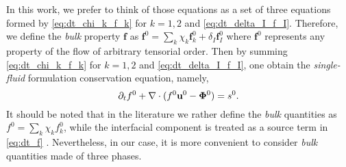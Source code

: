 In this work, we prefer to think of those equations as a set of three equations formed by \ref{eq:dt_chi_k_f_k} for $k=1,2$ and \ref{eq:dt_delta_I_f_I}. 
Therefore, we define the \textit{bulk} property $\textbf{f}$ as $\textbf{f}^0 = \sum_k \chi_k \textbf{f}_k^0 + \delta_I \textbf{f}_I^0$ where $\textbf{f}^0$ represents any property of the flow of arbitrary tensorial order.
Then by summing \ref{eq:dt_chi_k_f_k} for $k=1,2$ and \ref{eq:dt_delta_I_f_I}, one obtain the \textit{single-fluid} formulation conservation equation, namely,
\begin{equation}
    \partial_t f^0
    + \mathbf{\nabla}\cdot (
        f^0 \textbf{u}^0
        -  \mathbf{\Phi}^0 
     )
    = s^0. 
    \label{eq:dt_f}
\end{equation}
It should be noted that in the literature we rather define the \textit{bulk} quantities as $f^0 = \sum_k \chi_k f_k^0$, while the interfacial component is treated as a source term in \ref{eq:dt_f} \citep{morel2015mathematical,tryggvason2011direct,drew1983mathematical}. 
Nevertheless, in our case, it is more convenient to consider \textit{bulk} quantities made of three phases. 



